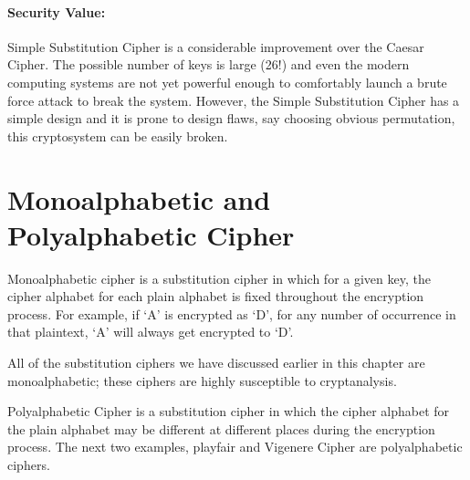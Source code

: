 \documentclass[british]{report}
\begin{document}
\paragraph*{Security Value:}

Simple Substitution Cipher is a considerable improvement over the
Caesar Cipher. The possible number of keys is large (26!) and even
the modern computing systems are not yet powerful enough to comfortably
launch a brute force attack to break the system. However, the Simple
Substitution Cipher has a simple design and it is prone to design
flaws, say choosing obvious permutation, this cryptosystem can be
easily broken.

\section{Monoalphabetic and Polyalphabetic Cipher}

Monoalphabetic cipher is a substitution cipher in which for a given
key, the cipher alphabet for each plain alphabet is fixed throughout
the encryption process. For example, if \textquoteleft A\textquoteright{}
is encrypted as \textquoteleft D\textquoteright , for any number of
occurrence in that plaintext, \textquoteleft A\textquoteright{} will
always get encrypted to \textquoteleft D\textquoteright .

All of the substitution ciphers we have discussed earlier in this
chapter are monoalphabetic; these ciphers are highly susceptible to
cryptanalysis.

Polyalphabetic Cipher is a substitution cipher in which the cipher
alphabet for the plain alphabet may be different at different places
during the encryption process. The next two examples, playfair and
Vigenere Cipher are polyalphabetic ciphers.
\end{document}
